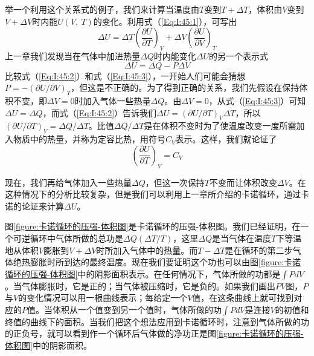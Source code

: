 举一个利用这个关系式的例子，我们来计算当温度由$T$变到$T +\Delta T$，体积由$V$变到$V +\Delta V$时内能$U(V,~T)$的变化。利用式（\ref{Eq:I:45:1}），可写出
\begin{equation}
    \label{Eq:I:45:2}
    \Delta U = \Delta T \left(\frac{\partial U}{\partial T}\right)_V + \Delta V \left(\frac{\partial U}{\partial V}\right)_T
\end{equation}
上一章我们发现当在气体中加进热量$\Delta Q$时内能变化$\Delta U$的另一个表示式
\begin{equation}
    \label{Eq:I:45:3}
    \Delta U = \Delta Q - P\Delta V
\end{equation}
比较式（\ref{Eq:I:45:2}）和式（\ref{Eq:I:45:3}），一开始人们可能会猜想$P=-(\partial U/\partial V)_T$，但这是不正确的。为了得到正确的关系，我们先假设在保持体积不变，即$\Delta V =0$时加入气体一些热量$\Delta Q$。由$\Delta V =0$，从式（\ref{Eq:I:45:3}）可知$\Delta U =\Delta Q$，而式（\ref{Eq:I:45:2}）告诉我们$\Delta U =(\partial U /\partial T)_V \Delta T$，所以$(\partial U /\partial T)_V =\Delta Q /\Delta T$。比值$\Delta Q /\Delta T$是在体积不变时为了使温度改变一度所需加入物质中的热量，并称为定容比热，用符号$C_V$表示。这样，我们就论证了
\begin{equation}
    \label{Eq:I:45:4}
    \left(\frac{\partial U}{\partial T}\right)_V = C_V
\end{equation}

现在，我们再给气体加入一些热量$\Delta Q$，但这一次保持$T$不变而让体积改变$\Delta V$。在这种情况下的分析比较复杂，但是我们可以利用上一章所介绍的卡诺循环，通过卡诺的论证来计算$\Delta U$。

图\ref{figure:卡诺循环的压强-体积图}是卡诺循环的压强-体积图。我们已经证明，在一个可逆循环中气体所做的总功是$\Delta Q(\Delta T /T)$，这里$\Delta Q$是当气体在温度$T$下等温地从体积$V$膨胀到$V +\Delta V$时所加入气体中的热量。而$T -\Delta T$是在循环的第二步气体绝热膨胀时所到达的最终温度。现在我们要证明这个功也可以由图\ref{figure:卡诺循环的压强-体积图}中的阴影面积表示。在任何情况下，气体所做的功都是$\int P dV$。当气体膨胀时，它是正的；当气体被压缩时，它是负的。如果我们画出$PV$图，$P$与$V$的变化情况可以用一根曲线表示；每给定一个$V$值，在这条曲线上就可找到对应的$P$值。当体积从一个值变到另一个值时，气体所做的功$\int Pd V$是连接$V$的初值和终值的曲线下的面积。当我们把这个想法应用到卡诺循环时，注意到气体所做的功的正负号，就可以看到作一个循环后气体做的净功正是图\ref{figure:卡诺循环的压强-体积图}中的阴影面积。


